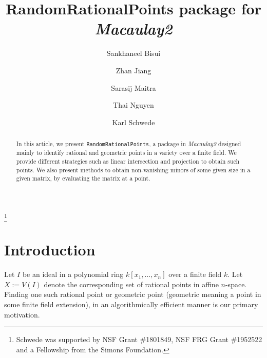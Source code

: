 \documentclass[11pt]{amsart}
\theoremstyle{definition}
\begin{document}
\title{{RandomRationalPoints} package for \emph{Macaulay2}}
\author{Sankhaneel Bisui}
\address{Department of Mathematics, Tulane University, New Orleans, LA 70118}
\author{Zhan Jiang}
\address{Department of Mathematics, University of Michigan, Ann Arbor, MI 48109}
\author{Sarasij Maitra}
\address{Department of Mathematics, University of Virginia, Charlottesville, VA 22904}
\author{Thai Nguyen}
\address{Department of Mathematics, Tulane University, New Orleans, LA 70118}
\author{Karl Schwede}
\address{Department of Mathematics, University of Utah, 155 S 1400 E Room 233, Salt Lake City, UT, 84112}

\thanks{Schwede was supported by NSF Grant \#1801849, NSF FRG Grant \#1952522 and a Fellowship from the Simons Foundation.}

\begin{abstract}
  In this article, we present {\tt RandomRationalPoints}, a package in \emph{Macaulay2} designed mainly to identify rational and geometric points in a variety over a finite field. We provide different strategies such as linear intersection and projection to obtain such points. We also present methods to obtain non-vanishing minors of some given size in a given matrix, by evaluating the matrix at a point.  %
\end{abstract}



\maketitle

\section{Introduction}
    Let $I$ be an ideal in a polynomial ring $k[x_1,\dots, x_n]$ over a finite field $k$. Let $X:=V(I)$ denote the corresponding set of rational points in affine $n$-space. Finding one such rational point or geometric point (geometric meaning a point in some finite field extension), in an algorithmically efficient manner is our primary motivation. 
\end{document}
